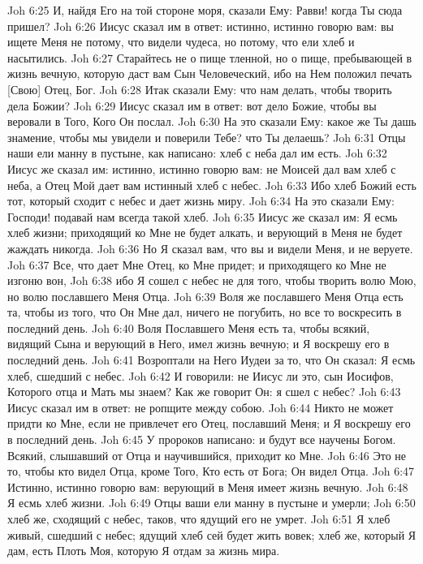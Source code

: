 Joh 6:25  И, найдя Его на той стороне моря, сказали Ему: Равви! когда Ты сюда пришел?
Joh 6:26  Иисус сказал им в ответ: истинно, истинно говорю вам: вы ищете Меня не потому, что видели чудеса, но потому, что ели хлеб и насытились.
Joh 6:27  Старайтесь не о пище тленной, но о пище, пребывающей в жизнь вечную, которую даст вам Сын Человеческий, ибо на Нем положил печать [Свою] Отец, Бог.
Joh 6:28  Итак сказали Ему: что нам делать, чтобы творить дела Божии?
Joh 6:29  Иисус сказал им в ответ: вот дело Божие, чтобы вы веровали в Того, Кого Он послал.
Joh 6:30  На это сказали Ему: какое же Ты дашь знамение, чтобы мы увидели и поверили Тебе? что Ты делаешь?
Joh 6:31  Отцы наши ели манну в пустыне, как написано: хлеб с неба дал им есть.
Joh 6:32  Иисус же сказал им: истинно, истинно говорю вам: не Моисей дал вам хлеб с неба, а Отец Мой дает вам истинный хлеб с небес.
Joh 6:33  Ибо хлеб Божий есть тот, который сходит с небес и дает жизнь миру.
Joh 6:34  На это сказали Ему: Господи! подавай нам всегда такой хлеб.
Joh 6:35  Иисус же сказал им: Я есмь хлеб жизни; приходящий ко Мне не будет алкать, и верующий в Меня не будет жаждать никогда.
Joh 6:36  Но Я сказал вам, что вы и видели Меня, и не веруете.
Joh 6:37  Все, что дает Мне Отец, ко Мне придет; и приходящего ко Мне не изгоню вон,
Joh 6:38  ибо Я сошел с небес не для того, чтобы творить волю Мою, но волю пославшего Меня Отца.
Joh 6:39  Воля же пославшего Меня Отца есть та, чтобы из того, что Он Мне дал, ничего не погубить, но все то воскресить в последний день.
Joh 6:40  Воля Пославшего Меня есть та, чтобы всякий, видящий Сына и верующий в Него, имел жизнь вечную; и Я воскрешу его в последний день.
Joh 6:41  Возроптали на Него Иудеи за то, что Он сказал: Я есмь хлеб, сшедший с небес.
Joh 6:42  И говорили: не Иисус ли это, сын Иосифов, Которого отца и Мать мы знаем? Как же говорит Он: я сшел с небес?
Joh 6:43  Иисус сказал им в ответ: не ропщите между собою.
Joh 6:44  Никто не может придти ко Мне, если не привлечет его Отец, пославший Меня; и Я воскрешу его в последний день.
Joh 6:45  У пророков написано: и будут все научены Богом. Всякий, слышавший от Отца и научившийся, приходит ко Мне.
Joh 6:46  Это не то, чтобы кто видел Отца, кроме Того, Кто есть от Бога; Он видел Отца.
Joh 6:47  Истинно, истинно говорю вам: верующий в Меня имеет жизнь вечную.
Joh 6:48  Я есмь хлеб жизни.
Joh 6:49  Отцы ваши ели манну в пустыне и умерли;
Joh 6:50  хлеб же, сходящий с небес, таков, что ядущий его не умрет.
Joh 6:51  Я хлеб живый, сшедший с небес; ядущий хлеб сей будет жить вовек; хлеб же, который Я дам, есть Плоть Моя, которую Я отдам за жизнь мира.
